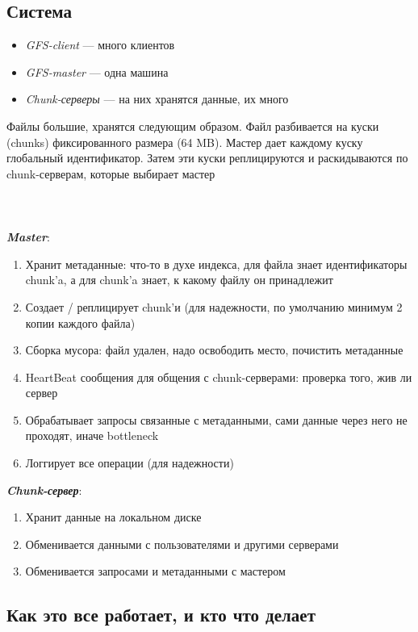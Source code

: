     \subsection{Система}
    \begin{itemize}
        \item \textit{GFS-client} --- много клиентов
        \item \textit{GFS-master} --- одна машина
        \item \textit{Chunk-серверы} --- на них хранятся данные, их много
    \end{itemize}
    \quad Файлы большие, хранятся следующим образом. Файл разбивается на куски (chunks) фиксированного размера (64 MB). Мастер дает каждому куску глобальный идентификатор. Затем эти куски реплицируются и раскидываются по chunk-серверам, которые выбирает мастер
    \\~\\
    \\~\\
    \textbf{\textit{Master}}:
    \begin{enumerate}
        \item Хранит метаданные: что-то в духе индекса, для файла знает идентификаторы chunk'a, а для chunk'a знает, к какому файлу он принадлежит
        \item Создает / реплицирует chunk'и (для надежности, по умолчанию минимум 2 копии каждого файла)
        \item Сборка мусора: файл удален, надо освободить место, почистить метаданные
        \item HeartBeat сообщения для общения с chunk-серверами: проверка того, жив ли сервер
        \item Обрабатывает запросы связанные с метаданными, сами данные через него не проходят, иначе bottleneck
        \item Логгирует все операции (для надежности)
    \end{enumerate}
    \textbf{\textit{Chunk-сервер}}:
    \begin{enumerate}
        \item Хранит данные на локальном диске
        \item Обменивается данными с пользователями и другими серверами
        \item Обменивается запросами и метаданными с мастером
    \end{enumerate}
    
    \subsection{Как это все работает, и кто что делает}
    
